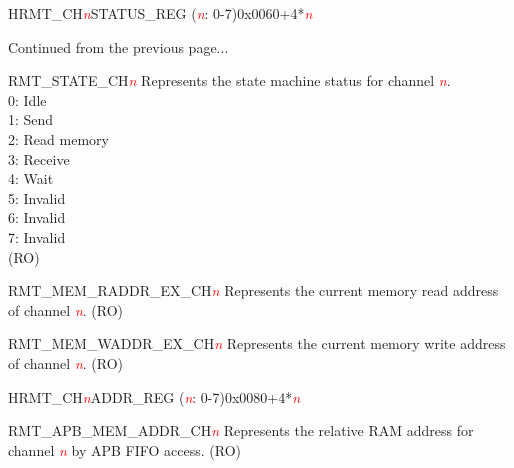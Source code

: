 \addtocounter{Regfloat}{-1}
\begin{register}{H}{RMT\_CH\textcolor{red}{\it{n}}STATUS\_REG (\textcolor{red}{\it{n}}: 0-7)}{0x0060+4*\textcolor{red}{\it{n}}}
\begin{regdesc}\begin{reglist}
\item [Continued from the previous page...]

\item [RMT\_STATE\_CH\textcolor{red}{\it{n}}] Represents the state machine status for channel \textcolor{red}{\it{n}}.\\
0: Idle\\
1: Send\\
2: Read memory\\
3: Receive\\
4: Wait\\
5: Invalid\\
6: Invalid\\
7: Invalid\\ (RO)
\item [RMT\_MEM\_RADDR\_EX\_CH\textcolor{red}{\it{n}}] Represents the current memory read address of channel \textcolor{red}{\it{n}}. (RO)
\item [RMT\_MEM\_WADDR\_EX\_CH\textcolor{red}{\it{n}}] Represents the current memory write address of channel \textcolor{red}{\it{n}}. (RO)
\end{reglist}\end{regdesc}
\end{register}


\begin{register}{H}{RMT\_CH\textcolor{red}{\it{n}}ADDR\_REG (\textcolor{red}{\it{n}}: 0-7)}{0x0080+4*\textcolor{red}{\it{n}}}\label{regdesc:RMTCHnADDRREG}
%
\regnewline%
\begin{regdesc}\begin{reglist}
\item [RMT\_APB\_MEM\_ADDR\_CH\textcolor{red}{\it{n}}] Represents the relative RAM address for channel \textcolor{red}{\it{n}} by APB FIFO access. (RO)
\end{reglist}\end{regdesc}
\end{register}


